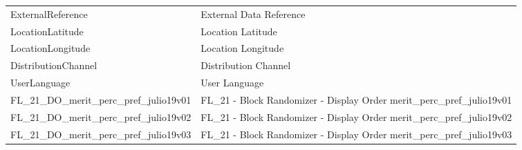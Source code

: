 \documentclass[
  10,
  landscape,
  legalpaper]{article}
\begin{document}
\begin{table}
{\begin{tabular}{l>{\raggedright\arraybackslash}p{10cm}}
ExternalReference & External Data Reference\\
LocationLatitude & Location Latitude\\
\addlinespace
LocationLongitude & Location Longitude\\
DistributionChannel & Distribution Channel\\
UserLanguage & User Language\\
FL\_21\_DO\_merit\_perc\_pref\_julio19v01 & FL\_21 - Block Randomizer - Display Order merit\_perc\_pref\_julio19v01\\
FL\_21\_DO\_merit\_perc\_pref\_julio19v02 & FL\_21 - Block Randomizer - Display Order merit\_perc\_pref\_julio19v02\\
\addlinespace
FL\_21\_DO\_merit\_perc\_pref\_julio19v03 & FL\_21 - Block Randomizer - Display Order merit\_perc\_pref\_julio19v03\\
\bottomrule
\end{tabular}}
\end{table}

\normalsize

\huge

\normalsize

\tiny
\end{document}
